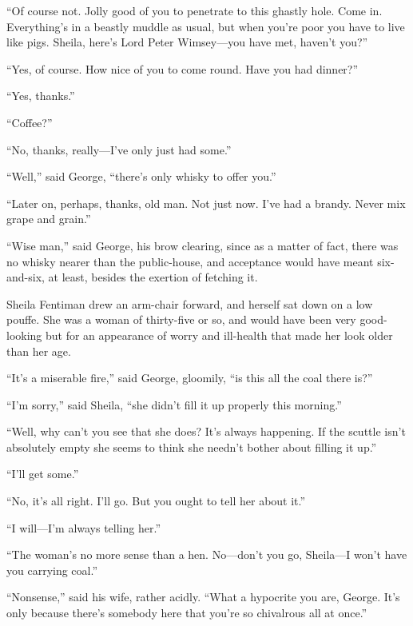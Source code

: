 \enquote{Of course not. Jolly good of you to penetrate to this ghastly hole. Come in. Everything's in a beastly muddle as usual, but when you're poor you have to live like pigs. Sheila, here's Lord Peter Wimsey\allowbreak---\allowbreak you have met, haven't you?}

\enquote{Yes, of course. How nice of you to come round. Have you had dinner?}

\enquote{Yes, thanks.}

\enquote{Coffee?}

\enquote{No, thanks, really\allowbreak---\allowbreak I've only just had some.}

\enquote{Well,} said George, \enquote{there's only whisky to offer you.}

\enquote{Later on, perhaps, thanks, old man. Not just now. I've had a brandy. Never mix grape and grain.}

\enquote{Wise man,} said George, his brow clearing, since as a matter of fact, there was no whisky nearer than the public-house, and acceptance would have meant six-and-six, at least, besides the exertion of fetching it.

Sheila Fentiman drew an arm-chair forward, and herself sat down on a low pouffe. She was a woman of thirty-five or so, and would have been very good-looking but for an appearance of worry and ill-health that made her look older than her age.

\enquote{It's a miserable fire,} said George, gloomily, \enquote{is this all the coal there is?}

\enquote{I'm sorry,} said Sheila, \enquote{she didn't fill it up properly this morning.}

\enquote{Well, why can't you see that she does? It's always happening. If the scuttle isn't absolutely empty she seems to think she needn't bother about filling it up.}

\enquote{I'll get some.}

\enquote{No, it's all right. I'll go. But you ought to tell her about it.}

\enquote{I will\allowbreak---\allowbreak I'm always telling her.}

\enquote{The woman's no more sense than a hen. No\allowbreak---\allowbreak don't you go, Sheila\allowbreak---\allowbreak I won't have you carrying coal.}

\enquote{Nonsense,} said his wife, rather acidly. \enquote{What a hypocrite you are, George. It's only because there's somebody here that you're so chivalrous all at once.}

